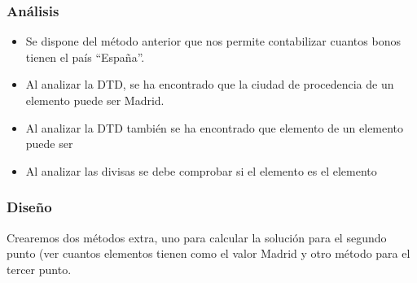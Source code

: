 \documentclass[letterpaper,10pt,spanish]{sphinxmanual}
\begin{document}
\subsubsection{Análisis}
\label{tema6:analisis}\begin{itemize}
\item {} 
Se dispone del método anterior  que nos permite contabilizar cuantos bonos tienen el país ``España''.

\item {} 
Al analizar la DTD, se ha encontrado que la ciudad de procedencia de un elemento  puede ser Madrid.

\item {} 
Al analizar la DTD también se ha encontrado que elemento  de un elemento  puede ser 

\item {} 
Al analizar las divisas se debe comprobar si el elemento  es el elemento 

\end{itemize}


\subsubsection{Diseño}
\label{tema6:diseno}
Crearemos dos métodos extra, uno para calcular la solución para el segundo punto (ver cuantos elementos  tienen como  el valor Madrid y otro método para el tercer punto.
\end{document}
